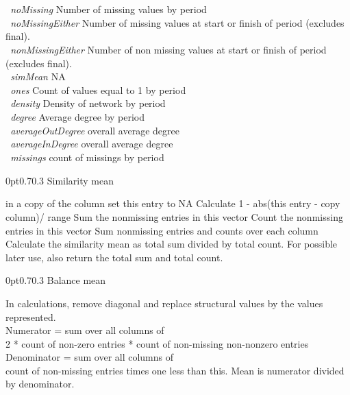 \documentclass[12pt,a4paper]{article}
\makeatletter
\renewcommand{\=}{\,=\,}
\newcommand{\+}{\,+\,}
\newcommand{\nnm}[1]{\textsf{\small\textit{#1}}}
\renewcommand{\subsection}{\@startsection{subsection}{2}
                {0pt}{0.7\baselineskip}{0.3\baselineskip}
                {\sffamily} }
\newcommand{\sfn}[1]{\textbf{\texttt{#1}}}
\makeatother
\begin{document}
\begin{algorithmic}
\sfn{ }\nnm{noMissing} Number of missing values by period\\
\sfn{ }\nnm{noMissingEither} Number of missing values at start or finish of
period (excludes final).\\
\sfn{ }\nnm{nonMissingEither} Number of non missing values at start or finish of
period (excludes final).\\
\sfn{ }\nnm{simMean} NA\\
\sfn{ }\nnm{ones} Count of values equal to 1 by period\\
\sfn{ }\nnm{density} Density of network by period\\
\sfn{ }\nnm{degree} Average degree by period\\
\sfn{ }\nnm{averageOutDegree} overall average degree\\
\sfn{ }\nnm{averageInDegree} overall average degree\\
\sfn{ }\nnm{missings} count of missings by period\\
\ENDIF
\ENDIF
\end{algorithmic}
\subsection{Similarity mean}
\label{sec:similarityMean}
\begin{algorithmic}
\STATE in a copy of the column set this entry to NA
\STATE Calculate 1 - abs(this entry - copy column)/ range
\STATE Sum the nonmissing entries in this vector
\STATE Count the nonmissing entries in this vector
\ENDFOR
\ENDFOR
\STATE Sum nonmissing entries and counts over each column
\STATE Calculate the similarity mean as total sum divided by total count.
\STATE For possible later use, also return the total sum and total count.
\end{algorithmic}
\subsection{Balance mean}
\label{sec:balmean}
\begin{algorithmic}
\STATE In calculations, remove diagonal and replace structural values by the
values represented.\\
\STATE Numerator = sum over all columns of\\
2 * count of non-zero entries * count of non-missing non-nonzero entries\\
\STATE Denominator = sum over all columns of \\
count of non-missing entries times one less than this.
\STATE Mean is numerator divided by denominator.
\end{algorithmic}
\end{document}
